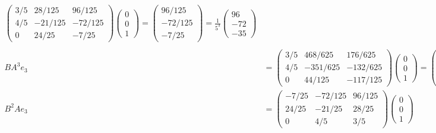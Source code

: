 \documentclass[12pt]{article}
\begin{document}
\begin{align*}
\begin{pmatrix}
                3/5 & 28/125 & 96/125\\ 
                4/5 & -21/125 & -72/125\\
                0 & 24/25 & -7/25
            \end{pmatrix}\begin{pmatrix}
                0\\0\\1
            \end{pmatrix} = \begin{pmatrix}
                96/125\\-72/125\\-7/25
            \end{pmatrix} =\frac{1}{5^3} \begin{pmatrix}
                96\\-72\\-35
            \end{pmatrix}\\ \\
            BA^3e_3 &= \begin{pmatrix}
                3/5 & 468/625 & 176/625\\
                4/5 & -351/625 & -132/625\\
                0 & 44/125 & -117/125
            \end{pmatrix}\begin{pmatrix}
                0\\0\\1
            \end{pmatrix} = \begin{pmatrix}
                176/625\\-132/625\\-117/125
            \end{pmatrix} = \frac{1}{5^4}\begin{pmatrix}
                176\\-132\\-585
            \end{pmatrix}\\
            B^2Ae_3 &= \begin{pmatrix}
                -7/25 & -72/125 & 96/125\\
                24/25 & -21/25 & 28/25\\
                0 & 4/5 & 3/5
            \end{pmatrix}\begin{pmatrix}
                0\\0\\1

\end{pmatrix}
\end{align*}
\end{document}
